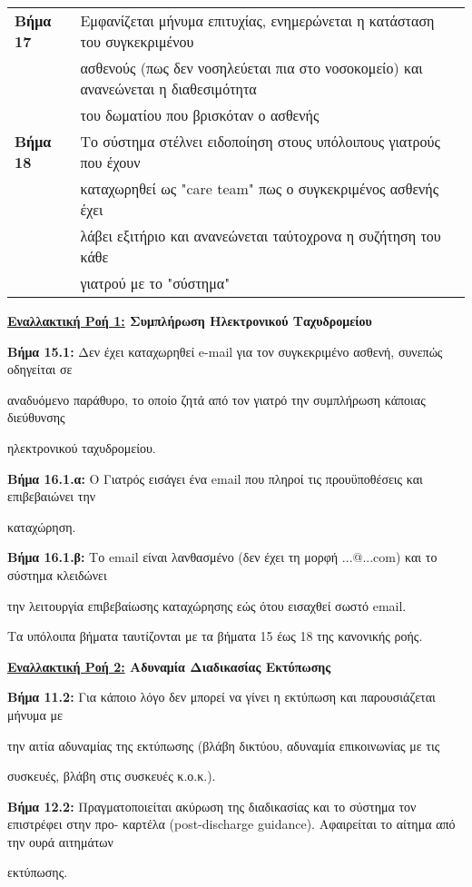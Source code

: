\documentclass{article}
\newcommand\T{\rule{0pt}{2.6ex}}       %
\newcommand\B{\rule[-1.2ex]{0pt}{0pt}}
\begin{document}
\begin{center}
\begin{tabular}{|l|l|}
      \hline
      \textbf{Βήμα 17} & Εμφανίζεται μήνυμα επιτυχίας, ενημερώνεται η κατάσταση του συγκεκριμένου \T \\& ασθενούς (πως δεν νοσηλεύεται πια στο νοσοκομείο) και ανανεώνεται η διαθεσιμότητα \\& του δωματίου που βρισκόταν ο ασθενής \B\\      
      \hline
      \textbf{Βήμα 18} & Το σύστημα στέλνει ειδοποίηση στους υπόλοιπους γιατρούς που έχουν \T \\& καταχωρηθεί ως "care team" πως ο συγκεκριμένος ασθενής έχει \\& λάβει εξιτήριο και ανανεώνεται ταύτοχρονα η συζήτηση του κάθε \\& γιατρού με το "σύστημα" \B \\
      \hline
     \end{tabular}
 \end{center}
 
  \textbf{\underline{Εναλλακτική Ροή 1:} Συμπλήρωση Ηλεκτρονικού Ταχυδρομείου} \vspace{0.2cm}
\par \textbf{Βήμα 15.1:} Δεν έχει καταχωρηθεί e-mail για τον συγκεκριμένο ασθενή, συνεπώς οδηγείται σε \par αναδυόμενο παράθυρο, το οποίο ζητά από τον γιατρό την συμπλήρωση κάποιας διεύθυνσης \par ηλεκτρονικού ταχυδρομείου.

\vspace{0.2cm}

\par \textbf{Βήμα 16.1.α:} Ο Γιατρός εισάγει ένα email που πληροί τις προυϋποθέσεις και επιβεβαιώνει την \par καταχώρηση. \vspace{0.2cm}
\par \textbf{Βήμα 16.1.β:} Το email είναι λανθασμένο (δεν έχει τη μορφή ...@...com) και το σύστημα κλειδώνει \par την λειτουργία επιβεβαίωσης καταχώρησης εώς ότου εισαχθεί σωστό email. \vspace{0.1cm}

\par Τα υπόλοιπα βήματα ταυτίζονται με τα βήματα 15 έως 18 της κανονικής ροής.

\vspace{0.2cm}

 \textbf{\underline{Εναλλακτική Ροή 2:} Αδυναμία Διαδικασίας Εκτύπωσης} \vspace{0.2cm}
\par \textbf{Βήμα 11.2:} Για κάποιο λόγο δεν μπορεί να γίνει η εκτύπωση και παρουσιάζεται μήνυμα με \par την αιτία αδυναμίας της εκτύπωσης (βλάβη δικτύου, αδυναμία επικοινωνίας με τις \par συσκευές, βλάβη στις συσκευές κ.ο.κ.).\vspace{0.1cm}
\par \textbf{Βήμα 12.2:} Πραγματοποιείται ακύρωση της διαδικασίας και το σύστημα τον επιστρέφει στην προ-  καρτέλα (post-discharge guidance). Αφαιρείται το αίτημα από την ουρά αιτημάτων \par εκτύπωσης.
\end{document}
